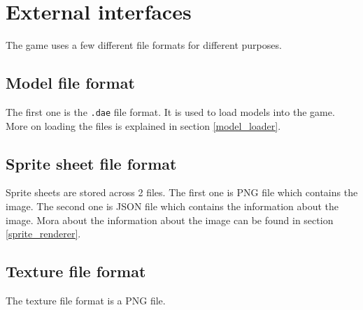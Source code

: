 \section{External interfaces}

The game uses a few different file formats for different purposes.

\subsection{Model file format}
The first one is the \texttt{.dae} file format.
It is used to load models into the game.
More on loading the files is explained in section \ref{model_loader}.

\subsection{Sprite sheet file format}
Sprite sheets are stored across 2 files. 
The first one is PNG file which contains the image.
The second one is JSON file which contains the information about the image.
Mora about the information about the image can be found in section \ref{sprite_renderer}.

\subsection{Texture file format}
The texture file format is a PNG file.